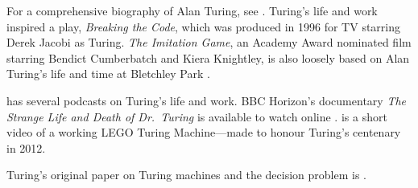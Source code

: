 \documentclass[../../../include/open-logic-section]{subfiles}
\begin{document}
\begin{reading}
For a comprehensive biography of Alan Turing, see \citet{Hodges2014}.
Turing's life and work inspired a play, \emph{Breaking the Code},
which was produced in 1996 for TV starring Derek Jacobi as
Turing. \emph{The Imitation Game}, an Academy Award nominated film
starring Bendict Cumberbatch and Kiera Knightley, is also loosely
based on Alan Turing's life and time at Bletchley Park
\citep{Imitation2014}.

\citet{Radiolab2012} has several podcasts on Turing's life and work.
BBC Horizon's documentary \emph{The Strange Life and Death of
  Dr.~Turing} is available to watch online \citep{Sykes1992}.
\citep{Theelen2012} is a short video of a working LEGO Turing
Machine---made to honour Turing's centenary in 2012.

Turing's original paper on Turing machines and the decision problem is
\citet{Turing1937}.
\end{reading}
\end{document}
